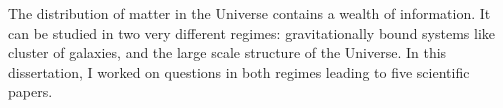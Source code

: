 The distribution of matter in the Universe contains a wealth of information. It can be studied in two very different regimes: gravitationally  bound systems like cluster of galaxies, and the  large scale structure of the Universe.  In this dissertation, I worked on questions in both regimes leading to five scientific papers.